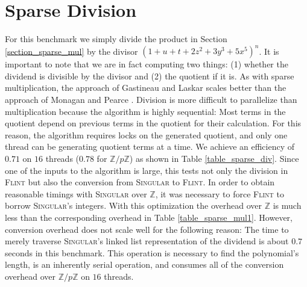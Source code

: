\documentclass{deliverablereport}
\begin{document}
\section{Sparse Division}
For this benchmark we simply divide the product in Section \ref{section_sparse_mul} by the divisor $(1+u+t+2z^2+3y^3+5x^5)^n$.
It is important to note that we are in fact computing two things: (1) whether the dividend is divisible by the divisor and (2) the quotient if it is. As with sparse multiplication, the approach of Gastineau and Laskar \cite{Gastineau:2015:PSM:2790282.2790285} scales better than the approach of Monagan and Pearce \cite{Monagan:2010:PSP:1837210.1837227}. Division is more difficult to parallelize than multiplication because the algorithm is highly sequential: Most terms in the quotient depend on previous terms in the quotient for their calculation. For this reason, the algorithm requires locks on the generated quotient, and only one thread can be generating quotient terms at a time. We achieve an efficiency of $0.71$ on $16$ threads ($0.78$ for $\mathbb{Z}/p\mathbb{Z}$) as shown in Table \ref{table_sparse_div}.
Since one of the inputs to the algorithm is large, this tests not only the division in \textsc{Flint} but also the conversion from \textsc{Singular} to \textsc{Flint}. In order to obtain reasonable timings with \textsc{Singular} over $\mathbb{Z}$, it was necessary to force \textsc{Flint} to borrow \textsc{Singular}'s integers. With this optimization the overhead over $\mathbb{Z}$ is much less than the corresponding overhead in Table \ref{table_sparse_mul1}. However, conversion overhead does not scale well for the following reason: The time to merely traverse \textsc{Singular}'s linked list representation of the dividend is about $0.7$ seconds in this benchmark. This operation is necessary to find the polynomial's length, is an inherently serial operation, and consumes all of the conversion overhead over $\mathbb{Z}/p\mathbb{Z}$ on $16$ threads.
\end{document}
